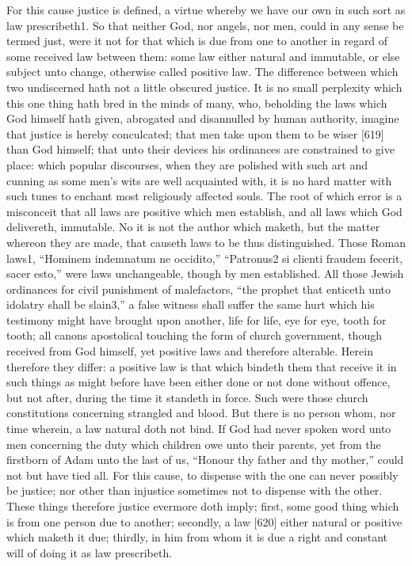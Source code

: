 For this cause justice is defined, a virtue whereby we have our own in such sort as law prescribeth1. So that neither God, nor angels, nor men, could in any sense be termed just, were it not for that which is due from one to another in regard of some received law between them: some law either natural and immutable, or else subject unto change, otherwise called positive law. The difference between which two undiscerned hath not a little obscured justice. It is no small perplexity which this one thing hath bred in the minds of many, who, beholding the laws which God himself hath given, abrogated and disannulled by human authority, imagine that justice is hereby conculcated; that men take upon them to be wiser [619] than God himself; that unto their devices his ordinances are constrained to give place: which popular discourses, when they are polished with such art and cunning as some men’s wits are well acquainted with, it is no hard matter with such tunes to enchant most religiously affected souls. The root of which error is a misconceit that all laws are positive which men establish, and all laws which God delivereth, immutable. No it is not the author which maketh, but the matter whereon they are made, that causeth laws to be thus distinguished. Those Roman laws1, “Hominem indemnatum ne occidito,” “Patronus2 si clienti fraudem fecerit, sacer esto,” were laws unchangeable, though by men established. All those Jewish ordinances for civil punishment of malefactors, “the prophet that enticeth unto idolatry shall be slain3,” a false witness shall suffer the same hurt which his testimony might have brought upon another, life for life, eye for eye, tooth for tooth; all canons apostolical touching the form of church government, though received from God himself, yet positive laws and therefore alterable. Herein therefore they differ: a positive law is that which bindeth them that receive it in such things as might before have been either done or not done without offence, but not after, during the time it standeth in force. Such were those church constitutions concerning strangled and blood. But there is no person whom, nor time wherein, a law natural doth not bind. If God had never spoken word unto men concerning the duty which children owe unto their parents, yet from the firstborn of Adam unto the last of us, “Honour thy father and thy mother,” could not but have tied all. For this cause, to dispense with the one can never possibly be justice; nor other than injustice sometimes not to dispense with the other. These things therefore justice evermore doth imply; first, some good thing which is from one person due to another; secondly, a law [620] either natural or positive which maketh it due; thirdly, in him from whom it is due a right and constant will of doing it as law prescribeth.

